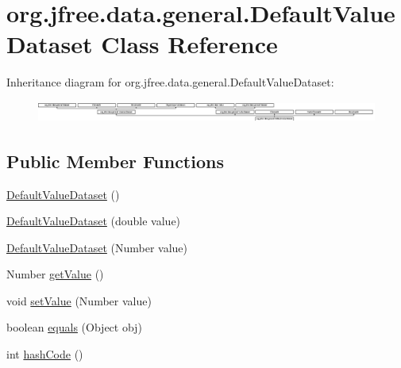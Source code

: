 \hypertarget{classorg_1_1jfree_1_1data_1_1general_1_1_default_value_dataset}{}\section{org.\+jfree.\+data.\+general.\+Default\+Value\+Dataset Class Reference}
\label{classorg_1_1jfree_1_1data_1_1general_1_1_default_value_dataset}
Inheritance diagram for org.\+jfree.\+data.\+general.\+Default\+Value\+Dataset\+:\begin{figure}[H]
\begin{center}
\leavevmode
\includegraphics[height=0.709759cm]{classorg_1_1jfree_1_1data_1_1general_1_1_default_value_dataset}
\end{center}
\end{figure}
\subsection*{Public Member Functions}
\begin{DoxyCompactItemize}
\item 
\mbox{\hyperlink{classorg_1_1jfree_1_1data_1_1general_1_1_default_value_dataset_a3c5f60e0757c0881c8c69b2201fb20bc}{Default\+Value\+Dataset}} ()
\item 
\mbox{\hyperlink{classorg_1_1jfree_1_1data_1_1general_1_1_default_value_dataset_a4470149ced6b73c0c7c59061cafac4c4}{Default\+Value\+Dataset}} (double value)
\item 
\mbox{\hyperlink{classorg_1_1jfree_1_1data_1_1general_1_1_default_value_dataset_a455930e9dc84a8a35ddd7fca85e94bc0}{Default\+Value\+Dataset}} (Number value)
\item 
Number \mbox{\hyperlink{classorg_1_1jfree_1_1data_1_1general_1_1_default_value_dataset_ab27ab5fa97b9cadbb6df5c039688ab69}{get\+Value}} ()
\item 
void \mbox{\hyperlink{classorg_1_1jfree_1_1data_1_1general_1_1_default_value_dataset_a7b15a7a42b3608ac1be10e0c9d71ab54}{set\+Value}} (Number value)
\item 
boolean \mbox{\hyperlink{classorg_1_1jfree_1_1data_1_1general_1_1_default_value_dataset_a42f3769bc0a1d837c9cbf3b8f331cd48}{equals}} (Object obj)
\item 
int \mbox{\hyperlink{classorg_1_1jfree_1_1data_1_1general_1_1_default_value_dataset_a1cc7d03beaf9ef8cc0ccba04b7bcadb2}{hash\+Code}} ()
\end{DoxyCompactItemize}
